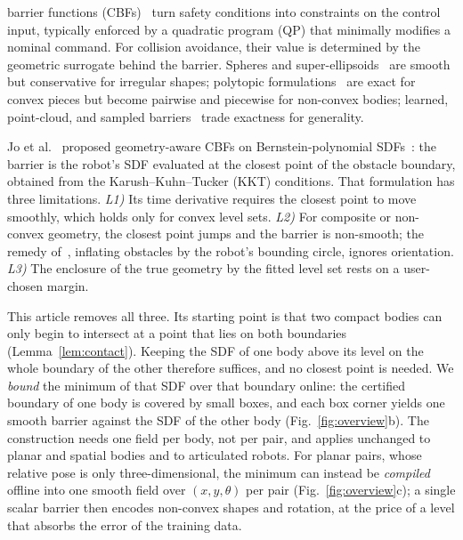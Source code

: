 \documentclass[journal]{IEEEtran}
\theoremstyle{definition}
\begin{document}
 barrier functions (CBFs)~\cite{ames2019cbf} turn safety conditions into
constraints on the control input, typically enforced by a quadratic program (QP) that minimally
modifies a nominal command. For collision avoidance, their value is determined by the geometric
surrogate behind the barrier. Spheres and super-ellipsoids~\cite{wang2017safety,wang2017quadrotors}
are smooth but conservative for irregular shapes; polytopic
formulations~\cite{chen2025minkowski,thirugnanam2025strongly} are exact for convex pieces but become
pairwise and piecewise for non-convex bodies; learned, point-cloud, and sampled
barriers~\cite{khan2022gaussian,long2021learning,dai2024sailing,lutkus2025sampling} trade exactness
for generality.

Jo et al.~\cite{jo2026geometry} proposed geometry-aware CBFs on Bernstein-polynomial
SDFs~\cite{li2024representing}: the barrier is the robot's SDF evaluated at the closest point of the
obstacle boundary, obtained from the Karush--Kuhn--Tucker (KKT) conditions. That formulation has
three limitations. \emph{L1)} Its time derivative requires the closest point to move smoothly, which
holds only for convex level sets. \emph{L2)} For composite or non-convex geometry, the closest point
jumps and the barrier is non-smooth; the remedy of~\cite{jo2026geometry}, inflating obstacles by
the robot's bounding circle, ignores orientation. \emph{L3)} The enclosure of the true geometry by
the fitted level set rests on a user-chosen margin.

This article removes all three. Its starting point is that two compact bodies can only begin to
intersect at a point that lies on both boundaries (Lemma~\ref{lem:contact}). Keeping the SDF of one
body above its level on the whole boundary of the other therefore suffices, and no closest point is
needed. We \emph{bound} the minimum of that SDF over that boundary online: the certified boundary of
one body is covered by small boxes, and each box corner yields one smooth barrier against the SDF of
the other body (Fig.~\ref{fig:overview}b). The construction needs one field per body, not per pair,
and applies unchanged to planar and spatial bodies and to articulated robots. For planar pairs, whose
relative pose is only three-dimensional, the minimum can instead be \emph{compiled} offline into one
smooth field over $(x,y,\theta)$ per pair (Fig.~\ref{fig:overview}c); a single scalar barrier then
encodes non-convex shapes and rotation, at the price of a level that absorbs the error of the
training data.
\end{document}
